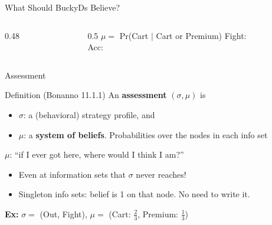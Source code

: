\begin{frame}{What Should BuckyDs Believe?}
\begin{columns}[c]
\begin{column}{0.48\textwidth}
\centering
{}
\end{column}
\begin{column}{0.5\textwidth}
$\mu=$ Pr(Cart $\mid$ Cart or Premium)
\bsk
Fight: \ans{1.1in}{$3\mu$}\\[6pt]
Acc: \ \ 
\end{column}
\end{columns}
\bsk
{}
\bsk
{}
\bsk
{}
\vspace{-0.3in}
\end{frame}

\begin{frame}{Assessment}
\begin{block}{Definition (Bonanno 11.1.1)}
An \textbf{assessment} $(\sigma,\mu)$ is
\begin{itemize}
    \item $\sigma$: a (behavioral) strategy profile, and
    \item $\mu$: a \textbf{system of beliefs}. Probabilities over the nodes in each info set
\end{itemize}
\end{block}
\bsk
$\mu$: ``if I ever got here, where would I think I am?''
\begin{itemize}
    \item Even at information sets that $\sigma$ never reaches!
    \item Singleton info sets: belief is 1 on that node. No need to write it.
\end{itemize}
\bsk
\textbf{Ex:} $\sigma=$ (Out, Fight), $\mu=$ (Cart: $\tfrac23$, Premium: $\tfrac13$)
\vspace{-0.3in}
\end{frame}

